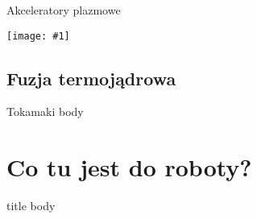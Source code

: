 \documentclass{beamer}
\newcommand {\framedgraphic}[1] {
        \begin{center}
            \texttt{[image: \#1]}
        \end{center}
}
\begin{document}
\begin{frame}[t]{Akceleratory plazmowe}
  \framedgraphic{img/plasmaaccelerator}  
\end{frame}



\subsection{Fuzja termojądrowa}
\begin{frame}[t]{Tokamaki}
  body
\end{frame}



\section{Co tu jest do roboty?}
\begin{frame}[t]{title}
  body
\end{frame}
\end{document}
